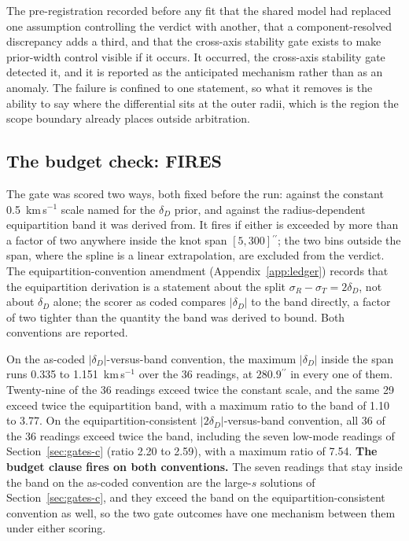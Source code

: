 \documentclass[11pt]{article}
\newcommand{\as}{\ensuremath{^{\prime\prime}}}
\newcommand{\dD}{\ensuremath{\delta_D}}
\begin{document}
The pre-registration recorded before any fit that the shared model had replaced one assumption controlling the verdict with another, that a component-resolved discrepancy adds a third, and that the cross-axis stability gate exists to make prior-width control visible if it occurs. It occurred, the cross-axis stability gate detected it, and it is reported as the anticipated mechanism rather than as an anomaly. The failure is confined to one statement, so what it removes is the ability to say where the differential sits at the outer radii, which is the region the scope boundary already places outside arbitration.

\subsection{The budget check: FIRES}
\label{sec:gates-d}

The gate was scored two ways, both fixed before the run: against the constant 0.5~km\,s$^{-1}$ scale named for the \dD{} prior, and against the radius-dependent equipartition band it was derived from. It fires if either is exceeded by more than a factor of two anywhere inside the knot span $[5, 300]\as$; the two bins outside the span, where the spline is a linear extrapolation, are excluded from the verdict. The equipartition-convention amendment (Appendix~\ref{app:ledger}) records that the equipartition derivation is a statement about the split $\sigma_R - \sigma_T = 2\dD$, not about \dD{} alone; the scorer as coded compares $|\dD|$ to the band directly, a factor of two tighter than the quantity the band was derived to bound. Both conventions are reported.

On the as-coded $|\dD|$-versus-band convention, the maximum $|\dD|$ inside the span runs 0.335 to 1.151~km\,s$^{-1}$ over the 36 readings, at $280.9\as$ in every one of them. Twenty-nine of the 36 readings exceed twice the constant scale, and the same 29 exceed twice the equipartition band, with a maximum ratio to the band of 1.10 to 3.77. On the equipartition-consistent $|2\dD|$-versus-band convention, all 36 of the 36 readings exceed twice the band, including the seven low-mode readings of Section~\ref{sec:gates-c} (ratio 2.20 to 2.59), with a maximum ratio of 7.54. \textbf{The budget clause fires on both conventions.} The seven readings that stay inside the band on the as-coded convention are the large-$s$ solutions of Section~\ref{sec:gates-c}, and they exceed the band on the equipartition-consistent convention as well, so the two gate outcomes have one mechanism between them under either scoring.
\end{document}
